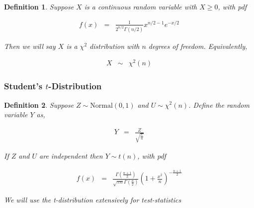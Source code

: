 \documentclass{beamer}
\newtheorem{defn}{Definition}
\numberwithin{equation}{section}
\begin{document}
\begin{frame}

\begin{defn}
Suppose $X$ is a continuous random variable with $X\geq 0$, with pdf 

\begin{eqnarray}
f(x) & = & \frac{1}{2^{n/2} \Gamma(n/2) } x^{n/2 - 1} e^{-x/2} \nonumber 
\end{eqnarray}

Then we will say $X$ is a $\chi^2$ distribution with $n$ degrees of freedom.  Equivalently,

\begin{eqnarray}
X & \sim & \chi^{2}(n) \nonumber 
\end{eqnarray}

\end{defn}



\end{frame}




\begin{frame}
\frametitle{Student's $t$-Distribution}




\begin{defn}
Suppose $Z \sim \text{Normal}(0, 1)$ and $U \sim \chi^2(n)$.  Define the random variable $Y$ as, 

\begin{eqnarray}
Y & = & \frac{Z}{\sqrt{\frac{U}{n}}} \nonumber 
\end{eqnarray}

If $Z$ and $U$ are independent then $Y \sim t(n)$, with pdf 

\begin{eqnarray}
f(x) & = & \frac{\Gamma(\frac{n+1}{2})}{\sqrt{\pi n } \Gamma(\frac{n}{2})}\left(1 + \frac{x^2}{n}\right)^{-\frac{n+1}{2}} \nonumber 
\end{eqnarray}

We will use the t-distribution extensively for \alert{test-statistics}


\end{defn}



\end{frame}
\end{document}
